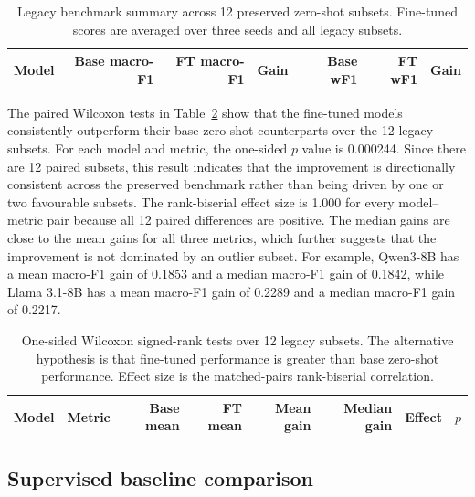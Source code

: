 \documentclass{elektr}
\begin{document}
\begin{table}[h!]
\caption{Legacy benchmark summary across 12 preserved zero-shot subsets. Fine-tuned scores are averaged over three seeds and all legacy subsets.}
\label{tab:legacy-summary}
\begin{center}
\begin{tabular}{lrrrrrr}
\hline
Model & Base macro-F1 & FT macro-F1 & Gain & Base wF1 & FT wF1 & Gain\\
\hline

\end{tabular}
\end{center}
\end{table}

The paired Wilcoxon tests in Table~\ref{tab:wilcoxon} show that the fine-tuned models consistently outperform their base zero-shot counterparts over the 12 legacy subsets. For each model and metric, the one-sided $p$ value is 0.000244. Since there are 12 paired subsets, this result indicates that the improvement is directionally consistent across the preserved benchmark rather than being driven by one or two favourable subsets. The rank-biserial effect size is 1.000 for every model--metric pair because all 12 paired differences are positive. The median gains are close to the mean gains for all three metrics, which further suggests that the improvement is not dominated by an outlier subset. For example, Qwen3-8B has a mean macro-F1 gain of 0.1853 and a median macro-F1 gain of 0.1842, while Llama 3.1-8B has a mean macro-F1 gain of 0.2289 and a median macro-F1 gain of 0.2217.

\begin{table}[h!]
\caption{One-sided Wilcoxon signed-rank tests over 12 legacy subsets. The alternative hypothesis is that fine-tuned performance is greater than base zero-shot performance. Effect size is the matched-pairs rank-biserial correlation.}
\label{tab:wilcoxon}
\begin{center}
\begin{tabular}{llrrrrrr}
\hline
Model & Metric & Base mean & FT mean & Mean gain & Median gain & Effect & $p$\\
\hline

\end{tabular}
\end{center}
\end{table}

\subsection{Supervised baseline comparison}
\end{document}
